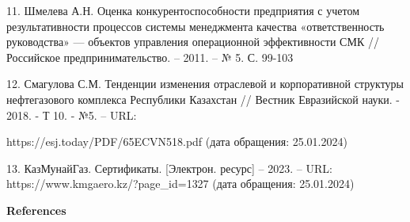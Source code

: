 \begin{noparindent}
11. Шмелева А.Н. Оценка конкурентоспособности предприятия с учетом
результативности процессов системы менеджмента качества «ответственность
руководства» --- объектов управления операционной эффективности СМК //
Российское предпринимательство. -- 2011. -- № 5. С. 99-103

12. Смагулова С.М. Тенденции изменения отраслевой и корпоративной
структуры нефтегазового комплекса Республики Казахстан // Вестник
Евразийской науки. - 2018. - Т 10. - №5. -- URL:

https://esj.today/PDF/65ECVN518.pdf (дата обращения: 25.01.2024)

13. КазМунайГаз. Сертификаты. {[}Электрон. ресурс{]} -- 2023. -- URL:
https://www.kmgaero.kz/?page\_id=1327 (дата обращения: 25.01.2024)
\end{noparindent}

\begin{center}
{\bfseries References}
\end{center}

